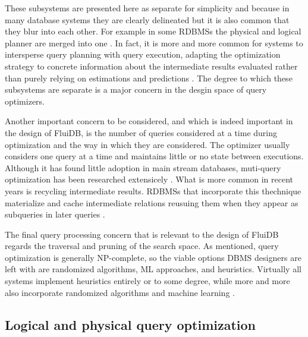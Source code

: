 These subsystems are presented here as separate for simplicity and
because in many database systems they are clearly delineated but it is
also common that they blur into each other. For example in some RDBMSs
the physical and logical planner are merged into one
\cite{graefeCascadesFrameworkQuery1995,shankarQueryOptimizationMicrosoft2012,solimanOrcaModularQuery2014}. In
fact, it is more and more common for systems to intersperse query
planning with query execution, adapting the optimization strategy
\cite{graefeDynamicQueryEvaluation1989} to concrete information about
the intermediate results evaluated rather than purely relying on
estimations and predictions
\cite{dingPlanStitchHarnessing2018,chaudhuriPayasyougoFrameworkQuery2008,wuSamplingbasedQueryReoptimization2016,herodotouXplusSqltuningawareQuery2010}. The
degree to which these subsystems are separate is a major concern in
the desgin space of query optimizers.

Another important concern to be considered, and which is indeed
important in the design of FluiDB, is the number of queries considered
at a time during optimization and the way in which they are
considered. The optimizer usually considers one query at a time and
maintains little or no state between executions. Although it has found
little adoption in main stream databases, muti-query optimization has
been researched extensicely
\cite{michiardiCachebasedMultiqueryOptimization2021,wangMultiqueryOptimizationMapreduce2013,royEfficientExtensibleAlgorithms2000,rogersMultiqueryOptimization2017}. What
is more common in recent years is recycling intermediate
results. RDBMSs that incorporate this thechnique materialize and cache
intermediate relations reusuing them when they appear as subqueries in
later queries
\cite{perezHistoryawareQueryOptimization2014,nagelRecyclingPipelinedQuery2013,ivanovaArchitectureRecyclingIntermediates2010}.

The final query processing concern that is relevant to the design of
FluiDB regards the traversal and pruning of the search space. As
mentioned, query optimization is generally NP-complete, so the viable
options DBMS designers are left with are randomized algorithms, ML
approaches, and heuristics. Virtually all systems implement heuristics
entirely or to some degree, while more and more also incorporate
randomized algorithms \cite{chandeGeneticOptimizationJoin2011} and
machine learning
\cite{liMachineLearningDatabases2021,marcusNeoLearnedQuery2019}.

\subsection{Logical and physical query optimization}

